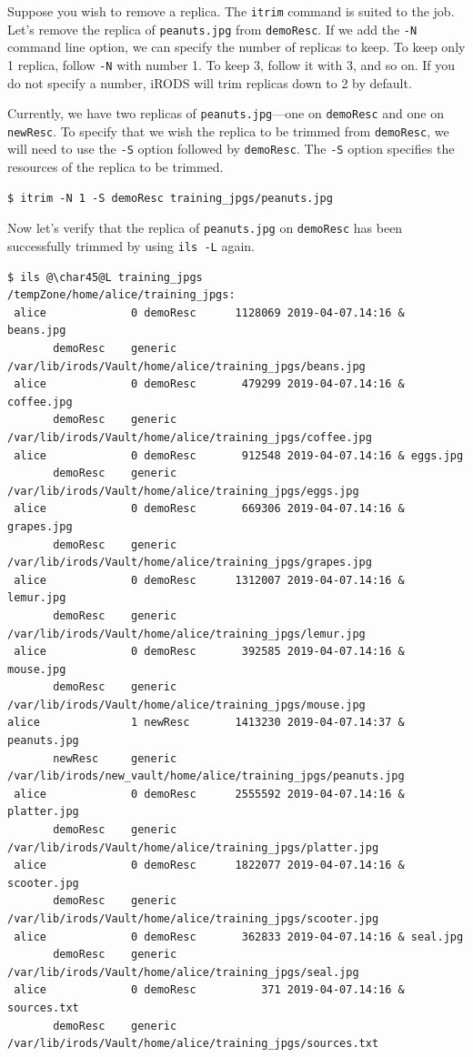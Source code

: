 \documentclass[10pt,oneside]{memoir}
\begin{document}
Suppose you wish to remove a replica. The \texttt{itrim} command is suited to the job. Let's remove the replica of \texttt{peanuts.jpg} from \texttt{demoResc}. If we add the \texttt{-N} command line option, we can specify the number of replicas to keep. To keep only 1 replica, follow \texttt{-N} with number 1. To keep 3, follow it with 3, and so on. If you do not specify a number, iRODS will trim replicas down to 2 by default.


Currently, we have two replicas of \texttt{peanuts.jpg}---one on \texttt{demoResc} and one on \texttt{newResc}. To specify that we wish the replica to be trimmed from \texttt{demoResc}, we will need to use the \texttt{-S} option followed by \texttt{demoResc}. The \texttt{-S} option specifies the resources of the replica to be trimmed.

\begin{lstlisting}
$ itrim -N 1 -S demoResc training_jpgs/peanuts.jpg
\end{lstlisting}

Now let's verify that the replica of \texttt{peanuts.jpg} on \texttt{demoResc} has been successfully trimmed by using \texttt{ils -L} again.

\begin{lstlisting}[basicstyle=\tiny\rmfamily]
$ ils @\char45@L training_jpgs
/tempZone/home/alice/training_jpgs:
 alice             0 demoResc      1128069 2019-04-07.14:16 & beans.jpg
       demoResc    generic    /var/lib/irods/Vault/home/alice/training_jpgs/beans.jpg
 alice             0 demoResc       479299 2019-04-07.14:16 & coffee.jpg
       demoResc    generic    /var/lib/irods/Vault/home/alice/training_jpgs/coffee.jpg
 alice             0 demoResc       912548 2019-04-07.14:16 & eggs.jpg
       demoResc    generic    /var/lib/irods/Vault/home/alice/training_jpgs/eggs.jpg
 alice             0 demoResc       669306 2019-04-07.14:16 & grapes.jpg
       demoResc    generic    /var/lib/irods/Vault/home/alice/training_jpgs/grapes.jpg
 alice             0 demoResc      1312007 2019-04-07.14:16 & lemur.jpg
       demoResc    generic    /var/lib/irods/Vault/home/alice/training_jpgs/lemur.jpg
 alice             0 demoResc       392585 2019-04-07.14:16 & mouse.jpg
       demoResc    generic    /var/lib/irods/Vault/home/alice/training_jpgs/mouse.jpg
alice              1 newResc       1413230 2019-04-07.14:37 & peanuts.jpg
       newResc     generic    /var/lib/irods/new_vault/home/alice/training_jpgs/peanuts.jpg
 alice             0 demoResc      2555592 2019-04-07.14:16 & platter.jpg
       demoResc    generic    /var/lib/irods/Vault/home/alice/training_jpgs/platter.jpg
 alice             0 demoResc      1822077 2019-04-07.14:16 & scooter.jpg
       demoResc    generic    /var/lib/irods/Vault/home/alice/training_jpgs/scooter.jpg
 alice             0 demoResc       362833 2019-04-07.14:16 & seal.jpg
       demoResc    generic    /var/lib/irods/Vault/home/alice/training_jpgs/seal.jpg
 alice             0 demoResc          371 2019-04-07.14:16 & sources.txt
       demoResc    generic    /var/lib/irods/Vault/home/alice/training_jpgs/sources.txt
\end{lstlisting}
\end{document}
